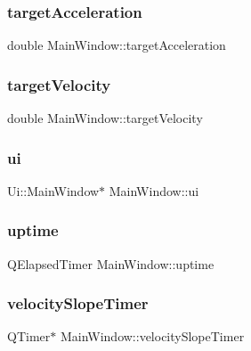 \subsubsection{\texorpdfstring{target\+Acceleration}{targetAcceleration}}
{\footnotesize\ttfamily double Main\+Window\+::target\+Acceleration}

\hypertarget{class_main_window_a468f6a2dee29d0488aa82f7e2583b5ae}{}\label{class_main_window_a468f6a2dee29d0488aa82f7e2583b5ae} 
\subsubsection{\texorpdfstring{target\+Velocity}{targetVelocity}}
{\footnotesize\ttfamily double Main\+Window\+::target\+Velocity}

\hypertarget{class_main_window_a35466a70ed47252a0191168126a352a5}{}\label{class_main_window_a35466a70ed47252a0191168126a352a5} 
\subsubsection{\texorpdfstring{ui}{ui}}
{\footnotesize\ttfamily Ui\+::\+Main\+Window$\ast$ Main\+Window\+::ui}

\hypertarget{class_main_window_af999866626ad70973845e180fe7666f8}{}\label{class_main_window_af999866626ad70973845e180fe7666f8} 
\subsubsection{\texorpdfstring{uptime}{uptime}}
{\footnotesize\ttfamily Q\+Elapsed\+Timer Main\+Window\+::uptime}

\hypertarget{class_main_window_abce15ec85ee2078bbb147d081e0a098b}{}\label{class_main_window_abce15ec85ee2078bbb147d081e0a098b} 
\subsubsection{\texorpdfstring{velocity\+Slope\+Timer}{velocitySlopeTimer}}
{\footnotesize\ttfamily Q\+Timer$\ast$ Main\+Window\+::velocity\+Slope\+Timer}

